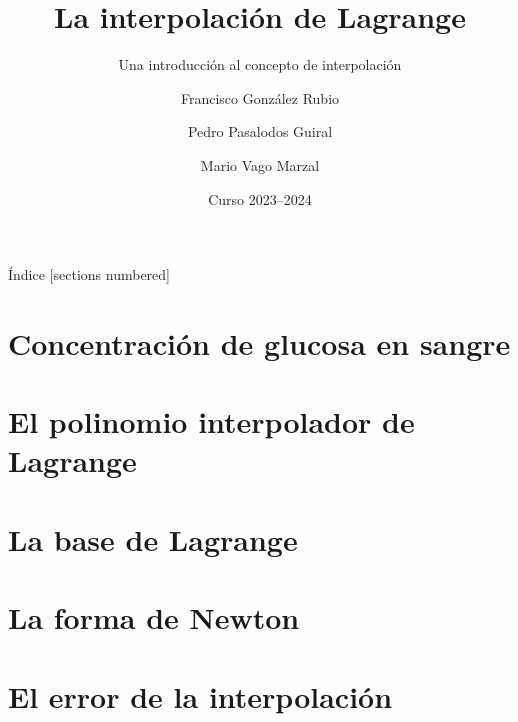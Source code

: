 \documentclass[9pt]{beamer}
\title{La interpolación de Lagrange}
\subtitle{Una introducción al concepto de interpolación}
\author{Francisco González Rubio \and Pedro Pasalodos Guiral%
  \and Mario Vago Marzal}
\date{Curso 2023--2024}
\institute{Universitat de València}
\begin{document}
  {
    \vfuzz=16pt
    \maketitle
  }

  \begin{frame}{Índice}
    [sections numbered]
    \tableofcontents
  \end{frame}

  \section{Concentración de glucosa en sangre}

  \section{El polinomio interpolador de Lagrange}

  \section{La base de Lagrange}

  \section{La forma de Newton}

  \section{El error de la interpolación}
\end{document}
